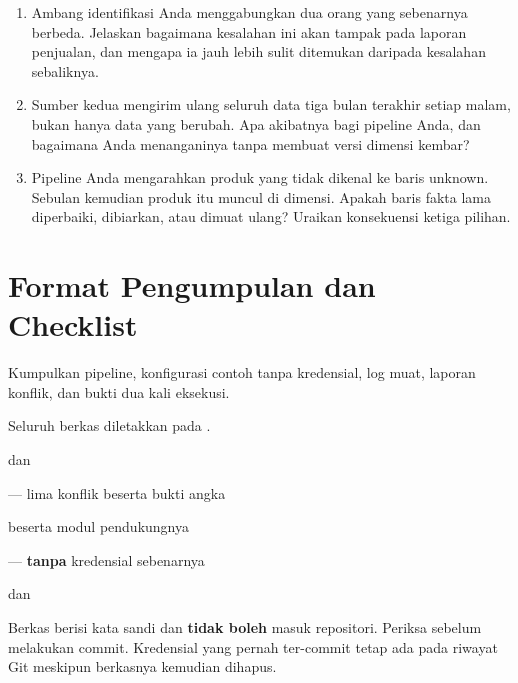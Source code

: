 \begin{enumerate}[leftmargin=1.4em]
  \item Ambang identifikasi Anda menggabungkan dua orang yang sebenarnya
        berbeda. Jelaskan bagaimana kesalahan ini akan tampak pada laporan
        penjualan, dan mengapa ia jauh lebih sulit ditemukan daripada
        kesalahan sebaliknya.
  \item Sumber kedua mengirim ulang seluruh data tiga bulan terakhir setiap
        malam, bukan hanya data yang berubah. Apa akibatnya bagi pipeline Anda,
        dan bagaimana Anda menanganinya tanpa membuat versi dimensi kembar?
  \item Pipeline Anda mengarahkan produk yang tidak dikenal ke baris unknown.
        Sebulan kemudian produk itu muncul di dimensi. Apakah baris fakta lama
        diperbaiki, dibiarkan, atau dimuat ulang? Uraikan konsekuensi ketiga
        pilihan.
\end{enumerate}

\section{Format Pengumpulan dan Checklist}

Kumpulkan pipeline, konfigurasi contoh tanpa kredensial, log muat, laporan
konflik, dan bukti dua kali eksekusi.

Seluruh berkas diletakkan pada .

\begin{ceklis}
  \item {}
  \item {} dan 
  \item {} --- lima konflik beserta bukti angka
  \item {} beserta modul pendukungnya
  \item {} --- \textbf{tanpa} kredensial sebenarnya
  \item {} dan 
  \item {}
  \item {}
\end{ceklis}

\begin{peringatan}
Berkas  berisi kata sandi dan \textbf{tidak boleh} masuk
repositori. Periksa  sebelum melakukan commit. Kredensial
yang pernah ter-commit tetap ada pada riwayat Git meskipun berkasnya kemudian
dihapus.
\end{peringatan}

